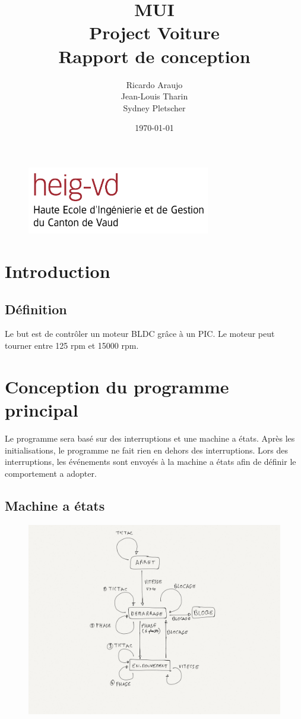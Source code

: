 \documentclass[fleqn, 11pt, a4paper]{article}
\author{Ricardo Araujo\\
  Jean-Louis Tharin\\
  Sydney Pletscher}
\title{MUI\\
Project Voiture\\
 Rapport de conception}
\date{\today}
\begin{document}
\maketitle
\vspace{8cm}
\begin{figure}[H]
\includegraphics[width=8cm]{heig-vd_logo_couleur_format_jpg}
\centering
\end{figure}

\newpage

\tableofcontents

\newpage

\section{Introduction}
	\subsection{Définition}
	Le but est de contrôler un moteur BLDC grâce à un PIC.
	Le moteur peut tourner entre 125 rpm et 15000 rpm.

	
	
\section{Conception du programme principal}
Le programme sera basé sur des interruptions et une machine a états.
Après les initialisations, le programme ne fait rien en dehors des interruptions.
Lors des interruptions, les événements sont envoyés à la machine a états afin de définir le comportement a adopter.

  \subsection{Machine a états}
  \begin{figure}[H]
  \includegraphics[width=12cm]{state_machine}
  \centering
  \end{figure}
\end{document}
